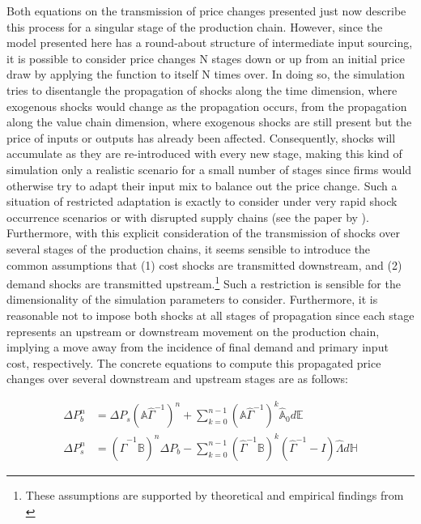 Both equations on the transmission of price changes presented just now describe this process for a singular stage of the production chain.
However, since the model presented here has a round-about structure of intermediate input sourcing, it is possible to consider price 
changes N stages down or up from an initial price draw by applying the function to itself N times over. In doing so, the simulation tries
to disentangle the propagation of shocks along the time dimension, where exogenous shocks would change as the propagation occurs, from the
propagation along the value chain dimension, where exogenous shocks are still present but the price of inputs or outputs has already been 
affected. Consequently, shocks will accumulate as they are re-introduced with every new stage, making this kind of simulation only a 
realistic scenario for a small number of stages since firms would otherwise try to adapt their input mix to balance out the price change. 
Such a situation of restricted adaptation is exactly to consider under very rapid shock occurrence scenarios or with disrupted supply 
chains (see the paper by \textcite{labelle2022GlobalSupplyChain}). Furthermore, with this explicit consideration of the transmission of 
shocks over several stages of the production chains, it seems sensible to introduce the common assumptions that (1) cost shocks are 
transmitted downstream, and (2) demand shocks are transmitted upstream.\footnote{These assumptions are supported by theoretical and 
empirical findings from \textcite{acemoglu2016NetworksMacroeconomyEmpirical}} Such a restriction is sensible for the dimensionality of 
the simulation parameters to consider. Furthermore, it is reasonable not to impose both shocks at all stages of propagation since each 
stage represents an upstream or downstream movement on the production chain, implying a move away from the incidence of final demand 
and primary input cost, respectively. The concrete equations to compute this propagated price changes over several downstream and 
upstream stages are as follows:

\begin{equation} \label{eq:propagation}
\begin{split}
    \Delta P_b^n &= \Delta P_s (\mathbb{A} \hat{\Gamma}^{-1})^n  + \sum_{k=0}^{n-1} (\mathbb{A} \hat{\Gamma}^{-1})^k \hat{\mathbb{A}}_0 d \mathbb{E} \\
    \Delta P_s^n &= (\hat{\Gamma}^{-1} \mathbb{B})^n \Delta P_b - \sum_{k=0}^{n-1} (\hat{\Gamma}^{-1} \mathbb{B})^k (\hat{\Gamma}^{-1} - I) \hat{\Lambda} d \mathbb{H}
\end{split}
\end{equation}

